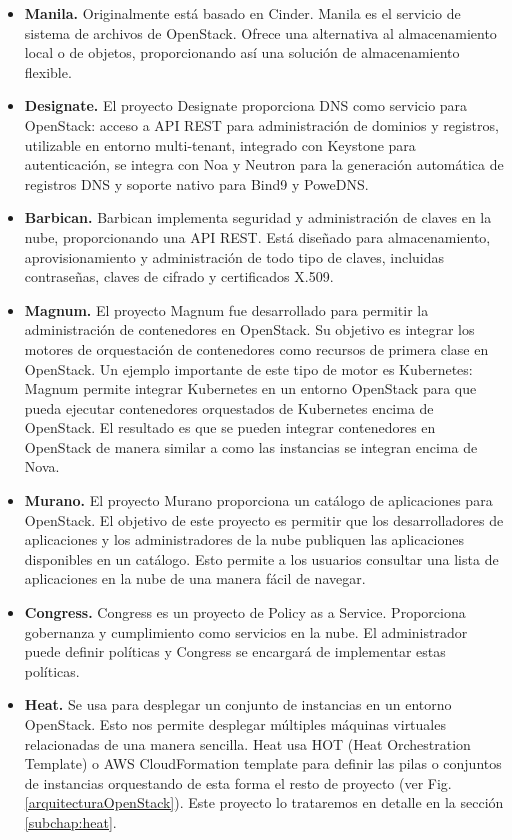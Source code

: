 \begin{itemize}
\item \textbf{Manila.} Originalmente está basado en Cinder. Manila es el servicio de sistema de archivos de OpenStack. Ofrece una alternativa al almacenamiento local o de objetos, proporcionando así una solución de almacenamiento flexible.\cite{noauthor_manila_nodate}

\item \textbf{Designate.} El proyecto Designate proporciona DNS como servicio para OpenStack: acceso a API REST para administración de dominios y registros, utilizable en entorno multi-tenant, integrado con Keystone para autenticación, se integra con Noa y Neutron para la generación automática de registros DNS y soporte nativo para Bind9 y PoweDNS.\cite{noauthor_designate_nodate}

\item \textbf{Barbican.} Barbican implementa seguridad y administración de claves en la nube, proporcionando una API REST. Está diseñado para almacenamiento, aprovisionamiento y administración de todo tipo de claves, incluidas contraseñas, claves de cifrado y certificados X.509.\cite{noauthor_barbican_nodate}

\item \textbf{Magnum.} El proyecto Magnum fue desarrollado para permitir la administración de contenedores en OpenStack.  Su objetivo es integrar los motores de orquestación de contenedores como recursos de primera clase en OpenStack. Un ejemplo importante de este tipo de motor es Kubernetes: Magnum permite integrar Kubernetes en un entorno OpenStack para que pueda ejecutar contenedores orquestados de Kubernetes encima de OpenStack. El resultado es que se pueden integrar contenedores en OpenStack de manera similar a como las instancias se integran encima de Nova.\cite{noauthor_magnum_nodate}

\item \textbf{Murano.} El proyecto Murano proporciona un catálogo de aplicaciones para OpenStack. El objetivo de este proyecto es permitir que los desarrolladores de aplicaciones y los administradores de la nube publiquen las aplicaciones disponibles en un catálogo. Esto permite a los usuarios consultar una lista de aplicaciones en la nube de una manera fácil de navegar.\cite{noauthor_murano_nodate}

\item\textbf{Congress.} Congress es un proyecto de Policy as a Service. Proporciona gobernanza y cumplimiento como servicios en la nube. El administrador puede definir políticas y Congress se encargará de implementar estas políticas.\cite{noauthor_congress_nodate}

\item\textbf{Heat.}  Se usa para desplegar un conjunto de instancias en un entorno OpenStack. Esto nos permite desplegar múltiples máquinas virtuales relacionadas de una manera sencilla. Heat usa HOT (Heat Orchestration Template) o AWS CloudFormation template para definir las pilas o conjuntos de instancias orquestando de esta forma el resto de proyecto (ver Fig.\ref{arquitecturaOpenStack}). Este proyecto lo trataremos en detalle en la sección \ref{subchap:heat}.
\end{itemize}

